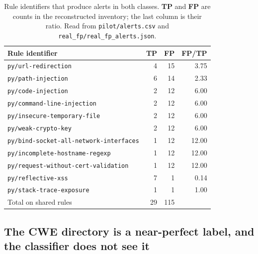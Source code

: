 \documentclass[journal]{IEEEtran}
\theoremstyle{definition}
\newcommand{\CTpOnShared}{29}
\newcommand{\CFpOnShared}{115}
\begin{document}
\begin{table}[t]
\centering
\caption{Rule identifiers that produce alerts in both classes. \textbf{TP} and
\textbf{FP} are counts in the reconstructed inventory; the last column is their
ratio. Read from \texttt{pilot/\allowbreak{}alerts.\allowbreak{}csv} and
\texttt{real\_\allowbreak{}fp/\allowbreak{}real\_\allowbreak{}fp\_\allowbreak{}alerts.\allowbreak{}json}.}
\label{tab:ruleoverlap}
\footnotesize
\setlength{\tabcolsep}{4pt}
\begin{tabular}{@{}lrrr@{}}
\toprule
Rule identifier & TP & FP & FP/TP \\
\midrule
\texttt{py/\allowbreak{}url-\allowbreak{}redirection} & 4 & 15 & 3.75 \\
\texttt{py/\allowbreak{}path-\allowbreak{}injection} & 6 & 14 & 2.33 \\
\texttt{py/\allowbreak{}code-\allowbreak{}injection} & 2 & 12 & 6.00 \\
\texttt{py/\allowbreak{}command-\allowbreak{}line-\allowbreak{}injection} & 2 & 12 & 6.00 \\
\texttt{py/\allowbreak{}insecure-\allowbreak{}temporary-\allowbreak{}file} & 2 & 12 & 6.00 \\
\texttt{py/\allowbreak{}weak-\allowbreak{}crypto-\allowbreak{}key} & 2 & 12 & 6.00 \\
\texttt{py/\allowbreak{}bind-\allowbreak{}socket-\allowbreak{}all-\allowbreak{}network-\allowbreak{}interfaces} & 1 & 12 & 12.00 \\
\texttt{py/\allowbreak{}incomplete-\allowbreak{}hostname-\allowbreak{}regexp} & 1 & 12 & 12.00 \\
\texttt{py/\allowbreak{}request-\allowbreak{}without-\allowbreak{}cert-\allowbreak{}validation} & 1 & 12 & 12.00 \\
\texttt{py/\allowbreak{}reflective-\allowbreak{}xss} & 7 & 1 & 0.14 \\
\texttt{py/\allowbreak{}stack-\allowbreak{}trace-\allowbreak{}exposure} & 1 & 1 & 1.00 \\
\midrule
Total on shared rules & \CTpOnShared & \CFpOnShared & \\
\bottomrule
\end{tabular}
\end{table}

\subsection{The CWE directory is a near-perfect label, and the classifier does
not see it}
\label{sec:cweleak}
\end{document}
